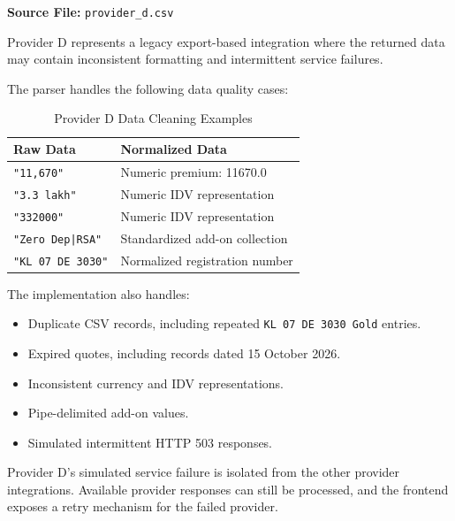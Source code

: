 \documentclass[11pt,a4paper]{article}
\begin{document}
\textbf{Source File:} \texttt{provider\_d.csv}

Provider D represents a legacy export-based integration where
the returned data may contain inconsistent formatting and
intermittent service failures.

The parser handles the following data quality cases:

\begin{table}[H]
\centering
\caption{Provider D Data Cleaning Examples}
\begin{tabularx}{\textwidth}{Y Y}
\toprule
\textbf{Raw Data} & \textbf{Normalized Data} \\
\midrule
\texttt{"11,670"} & Numeric premium: 11670.0 \\
\texttt{"3.3 lakh"} & Numeric IDV representation \\
\texttt{"332000"} & Numeric IDV representation \\
\texttt{"Zero Dep|RSA"} & Standardized add-on collection \\
\texttt{"KL 07 DE 3030"} & Normalized registration number \\
\bottomrule
\end{tabularx}
\end{table}

The implementation also handles:

\begin{itemize}
    \item Duplicate CSV records, including repeated
    \texttt{KL 07 DE 3030 Gold} entries.
    \item Expired quotes, including records dated
    15 October 2026.
    \item Inconsistent currency and IDV representations.
    \item Pipe-delimited add-on values.
    \item Simulated intermittent HTTP 503 responses.
\end{itemize}

\begin{warningbox}[title={Fault Tolerance}]
Provider D's simulated service failure is isolated from the
other provider integrations. Available provider responses can
still be processed, and the frontend exposes a retry mechanism
for the failed provider.
\end{warningbox}

\end{document}
